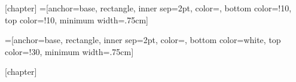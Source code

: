 \makeatother

\newcommand{\resetexos}{\def\exos{0}}
  
[chapter]
=[anchor=base,%
                    rectangle,%
                    inner sep=2pt,%
                    color=\scriptcolor,
                    bottom color=\scriptcolor!10,%
                    top color=\scriptcolor!10,%
                    minimum width=.75cm]

\newcommand{\kescht}[1]{\tikz[baseline]{\node[exosty] (exo) {\bfseries\textsf{#1}};}}

\newcommand{\exo}
		{\par%
		 \refstepcounter{exo}%
		 \noindent%
		 \tikz[baseline]{\node[exosty] (exo) {\bfseries\textsf{\theexo}};}
		 }




\newenvironment{exercices}[1][Exercices]
 {\phantomsection%
  \addcontentsline{toc}{section}{Exercices}%
  \medskip%
  \btitle{\Large #1}%
  \vspace{-1.75\baselineskip}%
  \begin{multicols}{2}%
  \setenumerate[1]{label=\alph*), ref=\theenumi.\alph*}
  \setenumerate[2]{label=\roman*), ref=\theenumii.\roman*} 
  }
 {\setenumerate[1]{ label=\arabic*. , ref=\arabic*, itemsep=1mm}
  \setenumerate[2]{label=\alph*), ref=\theenumi.\alph*}
  \setenumerate[3]{label=\roman*), ref=\theenumii.\roman*} 
  \end{multicols}%
  \vspace{-.5cm}%
  }



=[anchor=base,%
                    rectangle,%
                    inner sep=2pt,%
                    color=\scriptcolor,%
                    bottom color=white,%
                    top color=\scriptcolor!30,%
                    minimum width=.75cm]

\newcommand{\sol}
		{\par%
		 \refstepcounter{sol}%
		 \noindent%
		 \tikz[baseline]{\node[solsty] (sol) {\bfseries\textsf{\thesol}};}
		 }

[chapter]
\newenvironment{solutions}[1][Solutions]
 {\phantomsection%
  \addcontentsline{toc}{section}{Solutions}%
  \medskip%
  \btitleinv{\Large #1}%
  \vspace{-1.75\baselineskip}%
  \begin{multicols}{2}%
  \setenumerate[1]{label=\alph*), ref=\theenumi.\alph*}
  \setenumerate[2]{label=\roman*), ref=\theenumii.\roman*}
  }
 {\setenumerate[1]{ label=\arabic*. , ref=\arabic*, itemsep=1mm}
  \setenumerate[2]{label=\alph*), ref=\theenumi.\alph*}
  \setenumerate[3]{label=\roman*), ref=\theenumii.\roman*} 
  \end{multicols}%
  \vspace{-.5cm}%
  \noindent\color{\scriptcolor}\rule[0cm]{\textwidth}{1.5pt}%
  }



